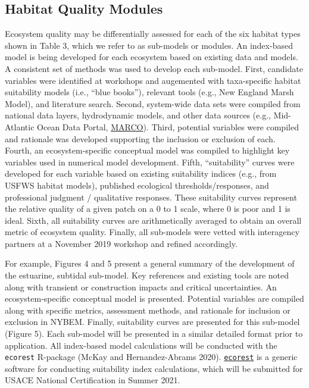 \documentclass[
]{book}
\begin{document}
\hypertarget{habitat-quality-modules}{%
\subsection{Habitat Quality Modules}\label{habitat-quality-modules}}

Ecosystem quality may be differentially assessed for each of the six habitat types shown in Table 3, which we refer to as sub-models or modules. An index-based model is being developed for each ecosystem based on existing data and models. A consistent set of methods was used to develop each sub-model. First, candidate variables were identified at workshops and augemented with taxa-specific habitat suitability models (i.e., ``blue books''), relevant tools (e.g., New England Marsh Model), and literature search. Second, system-wide data sets were compiled from national data layers, hydrodynamic models, and other data sources (e.g., Mid-Atlantic Ocean Data Portal, \href{https://portal.midatlanticocean.org/}{MARCO}). Third, potential variables were compiled and rationale was developed supporting the inclusion or exclusion of each. Fourth, an ecosystem-specific conceptual model was compiled to highlight key variables used in numerical model development. Fifth, ``suitability'' curves were developed for each variable based on existing suitability indices (e.g., from USFWS habitat models), published ecological thresholds/responses, and professional judgment / qualitative responses. These suitability curves represent the relative quality of a given patch on a 0 to 1 scale, where 0 is poor and 1 is ideal. Sixth, all suitability curves are arithmetically averaged to obtain an overall metric of ecosystem quality. Finally, all sub-models were vetted with interagency partners at a November 2019 workshop and refined accordingly.

For example, Figures 4 and 5 present a general summary of the development of the estuarine, subtidal sub-model. Key references and existing tools are noted along with transient or construction impacts and critical uncertainties. An ecosystem-specific conceptual model is presented. Potential variables are compiled along with specific metrics, assessment methods, and rationale for inclusion or exclusion in NYBEM. Finally, suitability curves are presented for this sub-model (Figure 5). Each sub-model will be presented in a similar detailed format prior to application. All index-based model calculations will be conducted with the \texttt{ecorest} R-package (McKay and Hernandez-Abrams 2020). \href{https://cran.r-project.org/web/packages/ecorest/index.html}{\texttt{ecorest}} is a generic software for conducting suitability index calculations, which will be submitted for USACE National Certification in Summer 2021.
\end{document}
